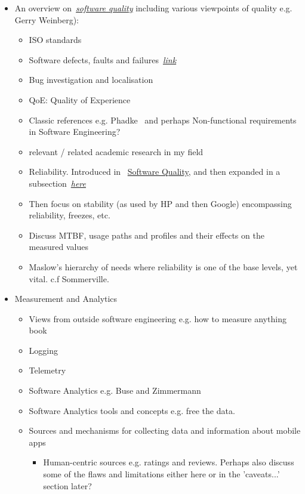 \begin{itemize}
    \item An overview on~\href{software.quality}{\emph{software quality}} including various viewpoints of quality e.g. Gerry Weinberg):
    \begin{itemize} 
        \item ISO standards
        \item Software defects, faults and failures~\hyperlink{defects.faults.failures}{\emph{link}}
        \item Bug investigation and localisation
        \item QoE: Quality of Experience
        \item Classic references e.g. Phadke~\citep{phadke1995_quality_engineering_using_robust_design} and perhaps Non-functional requirements in Software Engineering? 
        \item relevant / related academic research in my field
        \item Reliability. Introduced in ~\hyperlink{software.quality}{Software Quality}, and then expanded in a subsection~\hyperlink{software.reliability}{\emph{here}}
        \item Then focus on stability (as used by HP and then Google) encompassing reliability, freezes, etc.
        \item Discuss MTBF, usage paths and profiles and their effects on the measured values
        \item Maslow's hierarchy of needs where reliability is one of the base levels, yet vital. c.f Sommerville.
    \end{itemize}
    \item Measurement and Analytics
    \begin{itemize}
        \item Views from outside software engineering e.g. how to measure anything book
        \item Logging
        \item Telemetry
        \item Software Analytics e.g. Buse and Zimmermann
        \item Software Analytics tools and concepts e.g. free the data.
        \item Sources and mechanisms for collecting data and information about mobile apps
        \begin{itemize}
            \item Human-centric sources e.g. ratings and reviews. Perhaps also discuss some of the flaws and limitations either here or in the 'caveats...' section later?

\end{itemize}
\end{itemize}
\end{itemize}
